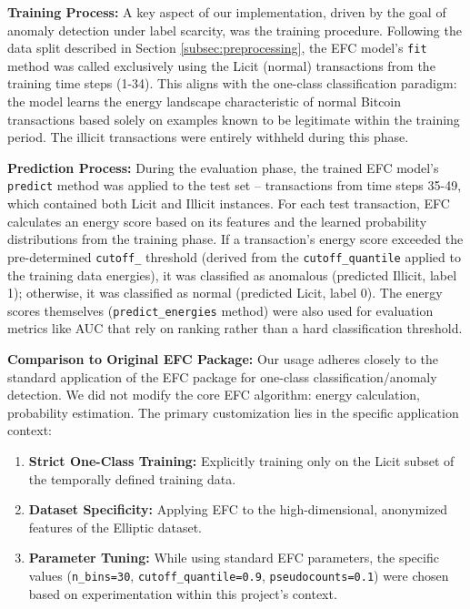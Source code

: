 \documentclass[12pt]{article}
\begin{document}
\textbf{Training Process:} A key aspect of our implementation, driven by the goal of anomaly detection under label scarcity,
was the training procedure. Following the data split described in Section \ref{subsec:preprocessing}, the EFC model's
\texttt{fit} method was called exclusively using the Licit (normal) transactions from the training time steps (1-34).
This aligns with the one-class classification paradigm: the model learns the energy landscape characteristic of normal
Bitcoin transactions based solely on examples known to be legitimate within the training period. The illicit transactions
were entirely withheld during this phase.

\textbf{Prediction Process:} During the evaluation phase, the trained EFC model's \texttt{predict} method was applied to
the test set -- transactions from time steps 35-49, which contained both Licit and Illicit instances. For each test
transaction, EFC calculates an energy score based on its features and the learned probability distributions from the
training phase. If a transaction's energy score exceeded the pre-determined \texttt{cutoff\_} threshold (derived from
the \texttt{cutoff\_quantile} applied to the training data energies), it was classified as anomalous (predicted Illicit,
label 1); otherwise, it was classified as normal (predicted Licit, label 0). The energy scores themselves
(\texttt{predict\_energies} method) were also used for evaluation metrics like AUC that rely on ranking rather than a
hard classification threshold.

\textbf{Comparison to Original EFC Package:} Our usage adheres closely to the standard application of the EFC package for
one-class classification/anomaly detection. We did not modify the core EFC algorithm: energy calculation, probability
estimation. The primary customization lies in the specific application context:

\begin{enumerate}
    \item \textbf{Strict One-Class Training:} Explicitly training only on the Licit subset of the temporally defined training data.
    \item \textbf{Dataset Specificity:} Applying EFC to the high-dimensional, anonymized features of the Elliptic dataset.
    \item \textbf{Parameter Tuning:} While using standard EFC parameters, the specific values (\texttt{n\_bins=30},
    \texttt{cutoff\_quantile=0.9}, \texttt{pseudocounts=0.1}) were chosen based on experimentation within this project's
    context.
\end{enumerate}
\end{document}
